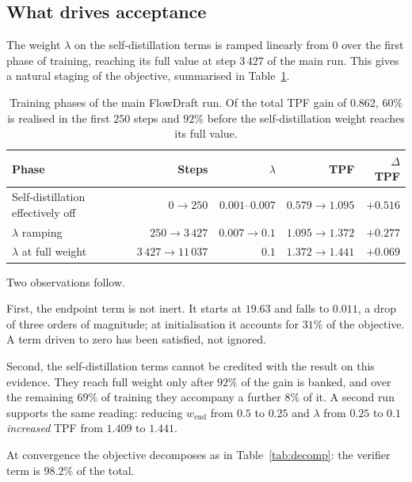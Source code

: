 \documentclass{zapiski}
\begin{document}
\subsection{What drives acceptance}
\label{sec:attribution}

The weight $\lambda$ on the self-distillation terms is ramped linearly from $0$
over the first phase of training, reaching its full value at step $3\,427$ of
the main run. This gives a natural staging of the objective, summarised in
Table~\ref{tab:phases}.

\begin{table}[!tbh]
\centering
\begin{tabular}{lrrrr}
\toprule
Phase & Steps & $\lambda$ & TPF & $\Delta$TPF \\
\midrule
Self-distillation effectively off & $0 \to 250$        & $0.001$--$0.007$ & $0.579 \to 1.095$ & $+0.516$ \\
$\lambda$ ramping                 & $250 \to 3\,427$   & $0.007 \to 0.1$  & $1.095 \to 1.372$ & $+0.277$ \\
$\lambda$ at full weight          & $3\,427 \to 11\,037$ & $0.1$          & $1.372 \to 1.441$ & $+0.069$ \\
\bottomrule
\end{tabular}
\caption{Training phases of the main FlowDraft run. Of the total TPF gain of
$0.862$, $60\%$ is realised in the first $250$ steps and $92\%$ before the
self-distillation weight reaches its full value.}
\label{tab:phases}
\end{table}

Two observations follow.

First, the endpoint term is not inert. It starts at $19.63$ and falls to
$0.011$, a drop of three orders of magnitude; at initialisation it accounts for
$31\%$ of the objective. A term driven to zero has been satisfied, not ignored.

Second, the self-distillation terms cannot be credited with the result on this
evidence. They reach full weight only after $92\%$ of the gain is banked, and
over the remaining $69\%$ of training they accompany a further $8\%$ of it. A
second run supports the same reading: reducing $w_{\mathrm{end}}$ from $0.5$ to
$0.25$ and $\lambda$ from $0.25$ to $0.1$ \emph{increased} TPF from $1.409$ to
$1.441$.

At convergence the objective decomposes as in Table~\ref{tab:decomp}: the
verifier term is $98.2\%$ of the total.
\end{document}
